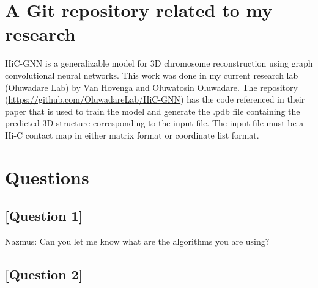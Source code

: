 \documentclass{article}
\begin{document}
\section{A Git repository related to my research}

HiC-GNN is a generalizable model for 3D chromosome reconstruction using graph convolutional neural networks. This work was done in my current research lab (Oluwadare Lab) by Van Hovenga and Oluwatosin Oluwadare. The repository (\url{https://github.com/OluwadareLab/HiC-GNN}) has the code referenced in their paper that is used to train the model and generate the .pdb file containing the predicted 3D structure corresponding to the input file. The input file must be a Hi-C contact map in either matrix format or coordinate list format.


\section{Questions}

\subsection{[Question 1]}

Nazmus: Can you let me know what are the algorithms you are using?

\subsection{[Question 2]}
\end{document}

